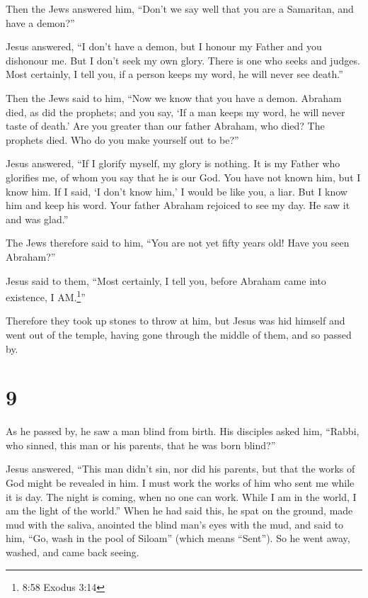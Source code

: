  Then the Jews answered him, ``Don't we say well that you
are a Samaritan, and have a demon?''

 Jesus answered, ``I don't have a demon, but I honour my
Father and you dishonour me.  But I don't seek my own
glory. There is one who seeks and judges.  Most certainly,
I tell you, if a person keeps my word, he will never see death.''

 Then the Jews said to him, ``Now we know that you have a
demon. Abraham died, as did the prophets; and you say, `If a man keeps
my word, he will never taste of death.'  Are you greater
than our father Abraham, who died? The prophets died. Who do you make
yourself out to be?''

 Jesus answered, ``If I glorify myself, my glory is
nothing. It is my Father who glorifies me, of whom you say that he is
our God.  You have not known him, but I know him. If I
said, `I don't know him,' I would be like you, a liar. But I know him
and keep his word.  Your father Abraham rejoiced to see my
day. He saw it and was glad.''

 The Jews therefore said to him, ``You are not yet fifty
years old! Have you seen Abraham?''

 Jesus said to them, ``Most certainly, I tell you, before
Abraham came into existence, I AM.\footnote{8:58 Exodus 3:14}''

 Therefore they took up stones to throw at him, but Jesus
was hid himself and went out of the temple, having gone through the
middle of them, and so passed by.

\hypertarget{section-8}{%
\section{9}\label{section-8}}

 As he passed by, he saw a man blind from birth.
 His disciples asked him, ``Rabbi, who sinned, this man or
his parents, that he was born blind?''

 Jesus answered, ``This man didn't sin, nor did his parents,
but that the works of God might be revealed in him.  I must
work the works of him who sent me while it is day. The night is coming,
when no one can work.  While I am in the world, I am the
light of the world.''  When he had said this, he spat on the
ground, made mud with the saliva, anointed the blind man's eyes with the
mud,  and said to him, ``Go, wash in the pool of Siloam''
(which means ``Sent''). So he went away, washed, and came back seeing.


